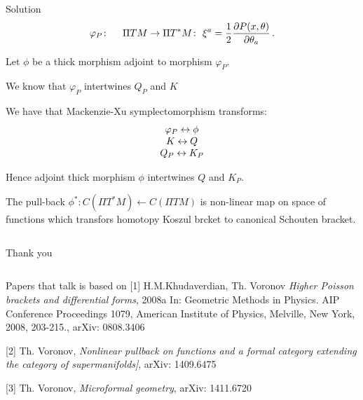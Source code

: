 \documentclass{beamer}
\def\p{\partial}
\def\p {\partial}
\begin{document}
\begin{frame}{Solution}
           $$
      \varphi_P\colon\quad\,\,\Pi TM\to\Pi T^*M\colon\,\,
 \xi^a={1\over 2}{\p P(x,\theta)\over \p \theta_a}\,.
         $$
  

      Let $\phi$ be a thick morphism adjoint to morphism $\varphi_P$.

We know that $\varphi_P$ intertwines $Q_P$ and $K$

We have  that Mackenzie-Xu symplectomorphism transforms:
             $$
\begin{matrix}
   \varphi_P\leftrightarrow \phi\cr
    K\leftrightarrow Q\cr
    Q_P\leftrightarrow K_P\cr
\end{matrix}
        $$
  
  Hence adjoint thick morphism $\phi$ intertwines $Q$ and $K_P$.
             

The pull-back $\phi^*\colon C(\Pi T^*M)\leftarrow C(\Pi TM)$
is non-linear map on space of functions which transfors
homotopy Koszul brcket to canonical Schouten bracket. 

\end{frame}

\begin{frame}
          $$ $$
        \centerline { Thank you}
           $$ $$
\end{frame}


\begin{frame}{Papers that talk is based on}
[1] H.M.Khudaverdian, Th. Voronov {\it Higher Poisson 
             brackets and differential forms}, 2008a
 In: Geometric Methods in Physics. AIP Conference Proceedings 1079, 
American Institute of Physics, Melville, New York, 2008, 203-215.,
       arXiv: 0808.3406
\medskip

[2] Th. Voronov, {\it Nonlinear pullback on functions and
a formal category extending the category of supermanifolds]},
          arXiv: 1409.6475

\medskip


[3] Th. Voronov, {\it Microformal geometry},
      arXiv: 1411.6720

\end{frame}
\end{document}
